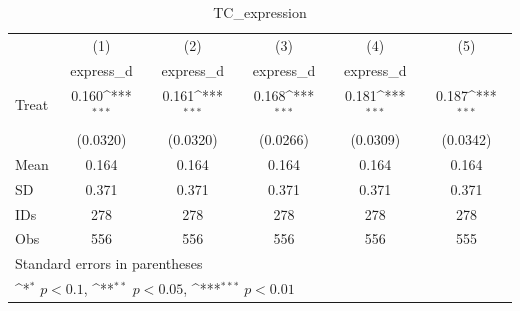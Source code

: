 \begin{table}[htbp]\centering
\def\sym#1{\ifmmode^{#1}\else\(^{#1}\)\fi}
\caption{TC\_expression}
\begin{tabular}{l*{5}{c}}
\hline\hline
                                &\multicolumn{1}{c}{(1)}&\multicolumn{1}{c}{(2)}&\multicolumn{1}{c}{(3)}&\multicolumn{1}{c}{(4)}&\multicolumn{1}{c}{(5)}\\
                                &\multicolumn{1}{c}{express\_d}&\multicolumn{1}{c}{express\_d}&\multicolumn{1}{c}{express\_d}&\multicolumn{1}{c}{express\_d}&\multicolumn{1}{c}{}\\
\hline
Treat                           &    0.160\sym{***}&    0.161\sym{***}&    0.168\sym{***}&    0.181\sym{***}&    0.187\sym{***}\\
                                & (0.0320)         & (0.0320)         & (0.0266)         & (0.0309)         & (0.0342)         \\
\hline
Mean                            &    0.164         &    0.164         &    0.164         &    0.164         &    0.164         \\
SD                              &    0.371         &    0.371         &    0.371         &    0.371         &    0.371         \\
IDs                             &      278         &      278         &      278         &      278         &      278         \\
Obs                             &      556         &      556         &      556         &      556         &      555         \\
\hline\hline
\multicolumn{6}{l}{\footnotesize Standard errors in parentheses}\\
\multicolumn{6}{l}{\footnotesize \sym{*} \(p<0.1\), \sym{**} \(p<0.05\), \sym{***} \(p<0.01\)}\\
\end{tabular}
\end{table}
